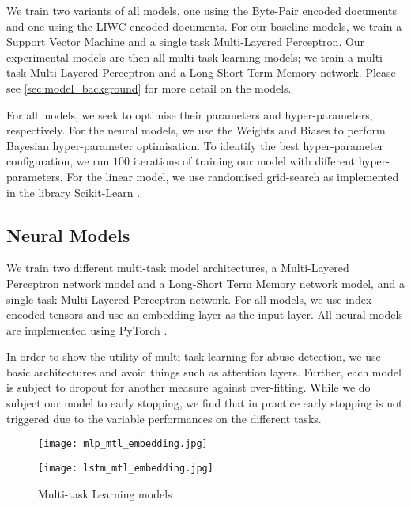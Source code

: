 We train two variants of all models, one using the Byte-Pair encoded documents and one using the LIWC encoded documents. For our baseline models, we train a Support Vector Machine and a single task Multi-Layered Perceptron. Our experimental models are then all multi-task learning models; we train a multi-task Multi-Layered Perceptron and a Long-Short Term Memory network. Please see \autoref{sec:model_background} for more detail on the models.

For all models, we seek to optimise their parameters and hyper-parameters, respectively. For the neural models, we use the Weights and Biases \cite{Wandb} to perform Bayesian hyper-parameter optimisation. To identify the best hyper-parameter configuration, we run $100$ iterations of training our model with different hyper-parameters. For the linear model, we use randomised grid-search as implemented in the library Scikit-Learn \cite{Pedregosa:2011}.

\subsection{Neural Models}

We train two different multi-task model architectures, a Multi-Layered Perceptron network model and a Long-Short Term Memory network model, and a single task Multi-Layered Perceptron network. For all models, we use index-encoded tensors and use an embedding layer as the input layer. All neural models are implemented using PyTorch \cite{Paszke:2019}.

In order to show the utility of multi-task learning for abuse detection, we use basic architectures and avoid things such as attention layers. Further, each model is subject to dropout for another measure against over-fitting.  While we do subject our model to early stopping, we find that in practice early stopping is not triggered due to the variable performances on the different tasks.

\begin{figure}
  \begin{minipage}{0.5\linewidth}
    \centering
    \texttt{[image: mlp\_mtl\_embedding.jpg]}
    \label{fig:mlp_mtl_embedding}
  \end{minipage}
  \begin{minipage}{0.5\linewidth}
    \centering
    \texttt{[image: lstm\_mtl\_embedding.jpg]}
    \label{fig:lstm_mtl_embedding}
  \end{minipage}
  \caption{Multi-task Learning models}
  \label{fig:mtl_models}
\end{figure}

